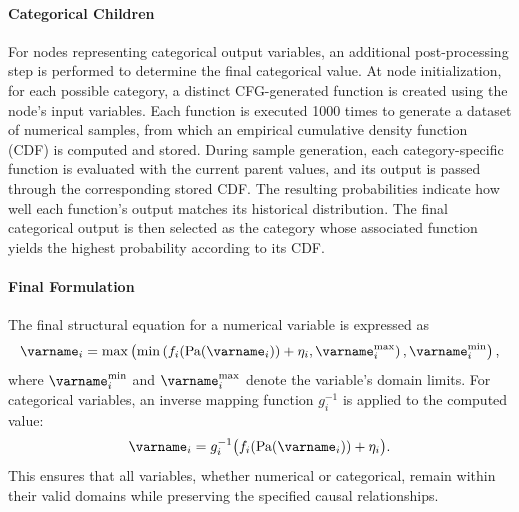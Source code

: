 \documentclass{uai2024} %
\begin{document}
            
            \paragraph{Categorical Children}
                For nodes representing categorical output variables, an additional post-processing step is performed to determine the final categorical value. 
                At node initialization, for each possible category, a distinct CFG-generated function is created using the node’s input variables. 
                Each function is executed 1000 times to generate a dataset of numerical samples, from which an empirical cumulative density function (CDF) is computed and stored. 
                During sample generation, each category-specific function is evaluated with the current parent values, and its output is passed through the corresponding stored CDF. 
                The resulting probabilities indicate how well each function’s output matches its historical distribution. 
                The final categorical output is then selected as the category whose associated function yields the highest probability according to its CDF. 


            \paragraph{Final Formulation}  
                The final structural equation for a numerical variable is expressed as
                \begin{equation*}
                    \varname_i = \max \left( \min \left( f_i(\text{Pa}(\varname_i)) + \eta_i, \varname_i^{\text{max}} \right), \varname_i^{\text{min}} \right),
                \end{equation*}
                where $\varname_i^{\text{min}}$ and $\varname_i^{\text{max}}$ denote the variable’s domain limits. For categorical variables, an inverse mapping function $g_i^{-1}$ is applied to the computed value:
                \begin{equation*}
                    \varname_i = g_i^{-1}\bigl(f_i(\text{Pa}(\varname_i)) + \eta_i\bigr).
                \end{equation*}
                This ensures that all variables, whether numerical or categorical, remain within their valid domains while preserving the specified causal relationships.
        
\end{document}
